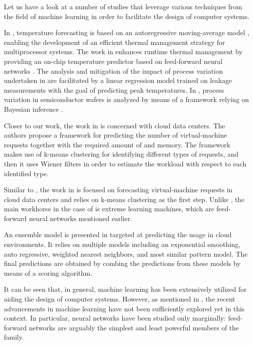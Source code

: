 Let us have a look at a number of studies that leverage various techniques from
the field of machine learning in order to facilitate the design of computer
systems.

In \cite{coskun2008}, temperature forecasting is based on an autoregressive
moving-average model \cite{hastie2009}, enabling the development of an efficient
thermal management strategy for multiprocessor systems. The work in
\cite{kumar2010} enhances runtime thermal management by providing an on-chip
temperature predictor based on feed-forward neural networks \cite{hastie2009}.
The analysis and mitigation of the impact of process variation undertaken in
\cite{juan2014} are facilitated by a linear regression model \cite{hastie2009}
trained on leakage measurements with the goal of predicting peak temperatures.
In \cite{ukhov2014}, process variation in semiconductor wafers is analyzed by
means of a framework relying on Bayesian inference \cite{hastie2009}.

Closer to our work, the work in \cite{dabbagh2015} is concerned with cloud data
centers. The authors propose a framework for predicting the number of
virtual-machine requests together with the required amount of  and
memory. The framework makes use of k-means clustering \cite{hastie2009} for
identifying different types of requests, and then it uses Wiener filters in
order to estimate the workload with respect to each identified type.

Similar to \cite{dabbagh2015}, the work in \cite{ismaeel2015} is focused on
forecasting virtual-machine requests in cloud data centers and relies on k-means
clustering as the first step. Unlike \cite{dabbagh2015}, the main workhorse in
the case of \cite{ismaeel2015} is extreme learning machines, which are
feed-forward neural networks mentioned earlier.

An ensemble model \cite{hastie2009} is presented in \cite{cao2014} targeted at
predicting the  usage in cloud environments. It relies on multiple
models including an exponential smoothing, auto regressive, weighted nearest
neighbors, and most similar pattern model. The final predictions are obtained by
combing the predictions from these models by means of a scoring algorithm.

It can be seen that, in general, machine learning has been extensively utilized
for aiding the design of computer systems. However, as mentioned in
, the recent advancements in machine learning have not been
sufficiently explored yet in this context. In particular, neural networks have
been studied only marginally: feed-forward networks are arguably the simplest
and least powerful members of the family.

